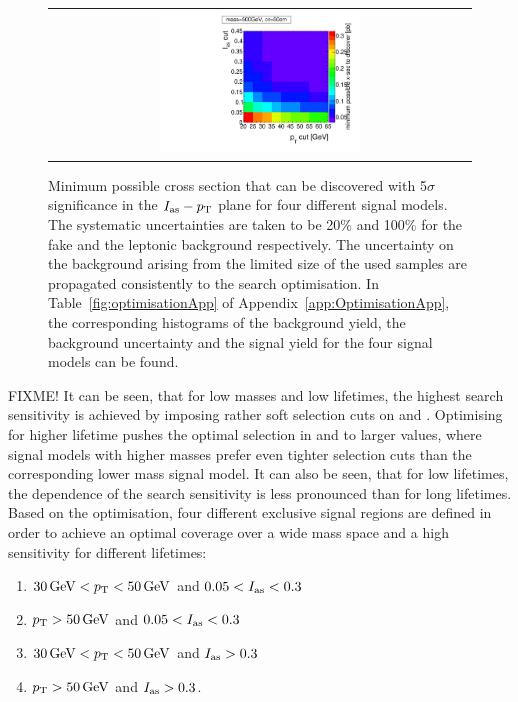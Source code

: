\begin{figure}[!h]
\begin{tabular}{c}
    \includegraphics[width=0.49\textwidth]{figures/analysis/Optimisation/Madgraph_signal_mass_500_ctau_50cm_ECaloLe5_SOverDeltaBStatPlusSys.pdf} 
  \end{tabular}
  \caption{Minimum possible cross section that can be discovered with 5$\sigma$ significance in the $I_{\text{as}}-p_{\text{T}}$ plane for four different signal models.
           The systematic uncertainties are taken to be 20\% and 100\% for the fake and the leptonic background respectively.
           The uncertainty on the background arising from the limited size of the used samples are propagated consistently to the search optimisation.
           In Table~\ref{fig:optimisationApp} of Appendix~\ref{app:OptimisationApp}, the corresponding histograms of the background yield, the background uncertainty and the signal yield for the four signal models can be found.}
  \vspace{30pt}
  \label{fig:optimisation}
\end{figure} 
FIXME!
It can be seen, that for low masses and low lifetimes, the highest search sensitivity is achieved by imposing rather soft selection cuts on \ias and \pt.
Optimising for higher lifetime pushes the optimal selection in \pt and \ias to larger values, where signal models with higher masses prefer even tighter \ias selection cuts than the corresponding lower mass signal model.
It can also be seen, that for low lifetimes, the \pt dependence of the search sensitivity is less pronounced than for long lifetimes.\\


Based on the optimisation, four different exclusive signal regions are defined in order to achieve an optimal coverage over a wide mass space and a high sensitivity for different lifetimes:
\begin{enumerate}[1.)]
\item $30\,\text{Ge}\kern-0.06667em\text{V}<p_{\text{T}}<50\,\text{Ge}\kern-0.06667em\text{V}$ and $0.05<I_{\text{as}}<0.3$
\item $p_{\text{T}}>50\,\text{Ge}\kern-0.06667em\text{V}$ and $0.05<I_{\text{as}}<0.3$
\item $30\,\text{Ge}\kern-0.06667em\text{V}<p_{\text{T}}<50\,\text{Ge}\kern-0.06667em\text{V}$ and $I_{\text{as}}>0.3$
\item $p_{\text{T}}>50\,\text{Ge}\kern-0.06667em\text{V}$ and $I_{\text{as}}>0.3$.\\
\end{enumerate}

